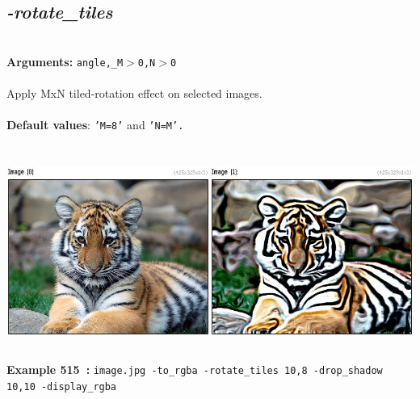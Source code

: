\documentclass[a4paper,11pt,twoside]{book}
\begin{document}
\subsection{\emph{-rotate\_tiles} }\vspace*{-0.5em}
~\\\textbf{Arguments: } 
{\small \texttt{angle,\_M$>$0,N$>$0}}\\~\\
Apply MxN tiled-rotation effect on selected images.
~\\~\\\textbf{Default values}: {\small \texttt{'M=8'} and \texttt{'N=M'.}}
\begin{center}\includegraphics[keepaspectratio=true,height=7cm,width=\textwidth]{img/gmic_def515.jpg}\\
{\footnotesize \textbf{Example 515~:} \texttt{image.jpg -to\_rgba -rotate\_tiles 10,8 -drop\_shadow 10,10 -display\_rgba}}
\end{center}
\end{document}
